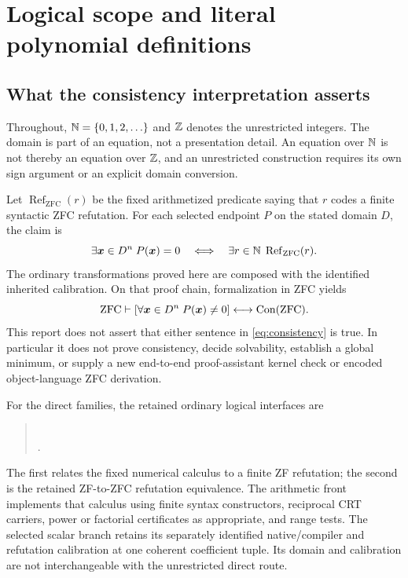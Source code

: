 \section{Logical scope and literal polynomial definitions}
\label{sec:foundation}
\subsection{What the consistency interpretation asserts}
Throughout, $\mathbb N=\{0,1,2,\ldots\}$ and $\mathbb Z$ denotes the unrestricted integers.
The domain is part of an equation, not a presentation detail. An equation over
$\mathbb N$ is not thereby an equation over $\mathbb Z$, and an unrestricted construction
requires its own sign argument or an explicit domain conversion.

Let $\operatorname{Ref}_{\mathrm{ZFC}}(r)$ be the fixed arithmetized predicate
saying that $r$ codes a finite syntactic ZFC refutation. For each selected
endpoint $P$ on the stated domain $D$, the claim is
\begin{equation}\label{eq:calibration}
 \exists\boldsymbol{x}\in D^n\;P(\boldsymbol{x})=0
 \quad\Longleftrightarrow\quad
 \exists r\in\mathbb N\;\operatorname{Ref}_{\mathrm{ZFC}}(r).
\end{equation}
The ordinary transformations proved here are composed with the identified
inherited calibration. On that proof chain, formalization in ZFC yields
\begin{equation}\label{eq:consistency}
 \mathrm{ZFC}\vdash
 \left[\forall\boldsymbol{x}\in D^n\;P(\boldsymbol{x})\ne0\right]
 \longleftrightarrow\operatorname{Con}(\mathrm{ZFC}).
\end{equation}
This report does not assert that either sentence in
\eqref{eq:consistency} is true. In particular it does not prove consistency,
decide solvability, establish a global minimum, or supply a new end-to-end
proof-assistant kernel check or encoded object-language ZFC derivation.

For the direct families, the retained ordinary logical interfaces are
\begin{quote}\small
{}\\
.
\end{quote}
The first relates the fixed numerical calculus to a finite ZF refutation;
the second is the retained ZF-to-ZFC refutation equivalence. The arithmetic
front implements that calculus using finite syntax constructors, reciprocal
CRT carriers, power or factorial certificates as appropriate, and range tests.
The selected scalar branch retains its separately identified native/compiler
and refutation calibration at one coherent coefficient tuple. Its domain
and calibration are not interchangeable with the unrestricted direct route.

